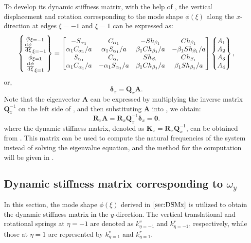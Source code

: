\documentclass[preprint,12pt]{elsarticle}
\newcommand{\id}{\mathrm{d}\mkern1mu}
\begin{document}
To develop its dynamic stiffness matrix, with the help of , the vertical displacement and rotation corresponding to the mode shape $\phi(\xi)$ along the $x$-direction at edges $\xi = -1$ and $\xi = 1$ can be expressed as:
%
\begin{equation}\label{eq:UBx}
	\begin{split}
		\begin{Bmatrix}
			\phi_{\xi=-1}\\\frac{\id \phi}{\id \xi}_{\xi=-1}\\\phi_{\xi=1}\\\frac{\id \phi}{\id \xi}_{\xi=1}
		\end{Bmatrix}
		= \begin{bmatrix}
			-S_{\alpha_1}&C_{\alpha_1}&-Sh_{\beta_1}&Ch_{\beta_1}\\
			\alpha_1 C_{\alpha_1}/a&\alpha_1S_{\alpha_1}/a&\beta_1Ch_{\beta_1}/a&-\beta_1Sh_{\beta_1}/a\\
			S_{\alpha_1}&C_{\alpha_1}&Sh_{\beta_1}&Ch_{\beta_1}\\
			\alpha_1 C_{\alpha_1}/a&-\alpha_1S_{\alpha_1}/a&\beta_1Ch_{\beta_1}/a&\beta_1Sh_{\beta_1}/a
		\end{bmatrix}
		\begin{Bmatrix}
			A_1\\A_2\\A_3\\A_4
		\end{Bmatrix} ,
	\end{split}
\end{equation}
%
or,
%
\begin{equation}\label{eq:UBx1}
	\mathbf{\delta}_x= \mathbf{Q}_x\mathbf{A}.
\end{equation}
%
Note that the eigenvector $\mathbf{A}$ can be expressed by multiplying the inverse matrix $\mathbf{Q}_x^{-1}$ on the left side of , and then substituting $\mathbf{A}$ into , we obtain:
%
\begin{equation}\label{eq:DSM_eqx}
	\mathbf{R}_x \mathbf{A}=\mathbf{R}_x\mathbf{Q}_x^{-1}\mathbf{\delta}_x = \mathbf{0}.
\end{equation}
%
where the dynamic stiffness matrix, denoted as $\mathbf{K}_x = \mathbf{R}_x\mathbf{Q}_x^{-1}$, can be obtained from . 
This matrix can be used to compute the natural frequencies of the system instead of solving the eigenvalue equation, 
and the method for the computation will be given in .

\subsection{Dynamic stiffness matrix corresponding to \(\omega_y\)}\label{sec:DSMy}
In this section, the mode shape \(\phi(\xi)\) derived in \(\Cref{sec:DSMx}\) is utilized to obtain the dynamic stiffness matrix in the \(y\)-direction.  
The vertical translational and rotational springs at \(\eta = -1\) are denoted as \(k^v_{\eta = -1}\) and \(k^r_{\eta = -1}\), respectively, while those at \(\eta = 1\) are represented by \(k^v_{\eta = 1}\) and \(k^r_{\eta = 1}\).
\end{document}
